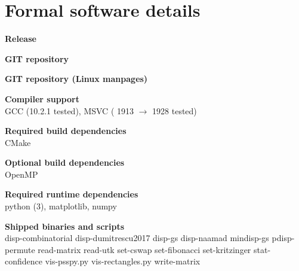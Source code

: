 \section*{Formal software details}
  \textbf{Release}\\
  \dptkversion
  
  \textbf{GIT repository}\\
  
  \textbf{GIT repository (Linux manpages)}\\
  
  \textbf{Compiler support}\\
  GCC (10.2.1 tested), MSVC ( 1913 $\rightarrow$ 1928 tested)

  \textbf{Required build dependencies}\\
  CMake
    
  \textbf{Optional build dependencies}\\
  OpenMP
  
  \textbf{Required runtime dependencies}\\
  python (3), matplotlib, numpy
  
  \textbf{Shipped binaries and scripts}\\
  disp-combinatorial
disp-dumitrescu2017
disp-gs
disp-naamad
mindisp-gs
pdisp-permute
read-matrix
read-utk
set-cswap
set-fibonacci
set-kritzinger
stat-confidence
vis-psspy.py
vis-rectangles.py
write-matrix
\clearpage
